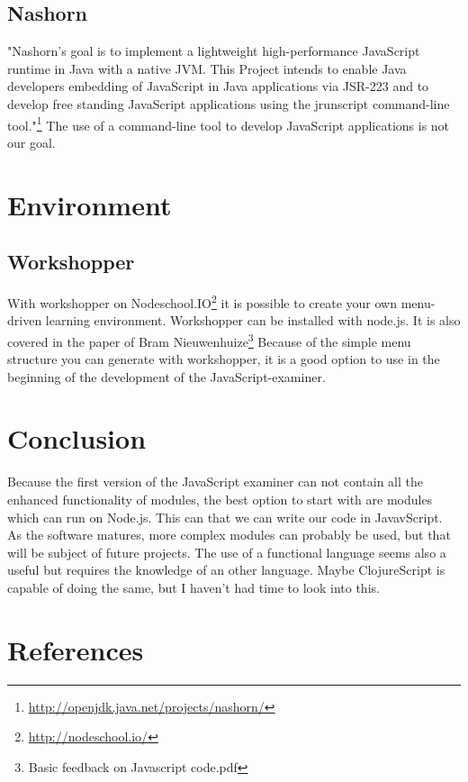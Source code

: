 \documentclass{article}
\begin{document}
\subsection{Nashorn}
"Nashorn's goal is to implement a lightweight high-performance JavaScript runtime in Java with a native JVM.
This Project intends to enable Java developers embedding of JavaScript in Java applications via JSR-223 and to develop 
free standing JavaScript applications using the jrunscript command-line tool."\footnote{\url{http://openjdk.java.net/projects/nashorn/}}
The use of a command-line tool to develop JavaScript applications is not our goal.

\section{Environment}
\subsection{Workshopper}
With workshopper on Nodeschool.IO\footnote{\url{http://nodeschool.io/}} it is possible to create your own menu-driven learning environment. 
Workshopper can be installed with node.js.
It is also covered in the paper of Bram Nieuwenhuize\footnote{Basic feedback on Javascript code.pdf}
Because of the simple menu structure you can generate with workshopper, it is a good option to use in 
the beginning of the development of the JavaScript-examiner.

\section{Conclusion}
Because the first version of the JavaScript examiner can not contain all the enhanced 
functionality of modules, the best option to start with are modules which can run on Node.js.
This can that we can write our code in JavavScript.
As the software matures, more complex modules can probably be used, but that will be subject of future projects.
The use of a functional language seems also a useful but requires the knowledge of an other language.
Maybe ClojureScript is capable of doing the same, but I haven't had time to look into this.  

\section{References}
\end{document}
